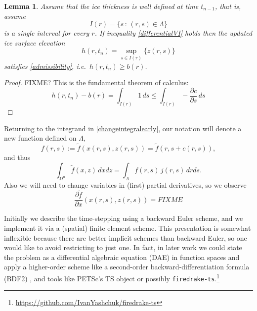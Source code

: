 \documentclass[letterpaper,final,12pt,reqno]{amsart}
\newtheorem{lemma}{Lemma}
\begin{document}
\begin{lemma}
Assume that the ice thickness is well defined at time $t_{n-1}$, that is, assume
    $$I(r) = \{s\,:\,(r,s) \in \Lambda\}$$
is a single interval for every $r$.  If inequality \eqref{differentialVI} holds then the updated ice surface elevation
    $$h(r,t_n) = \sup_{s\in I(r)}\{z(r,s)\}$$
satisfies \eqref{admissibility}, i.e.~$h(r,t_n)\ge b(r)$.
\end{lemma}

\begin{proof}
FIXME? This is the fundamental theorem of calculus:
    $$h(r,t_n) - b(r) = \int_{I(r)} 1\,ds \le \int_{I(r)} - \frac{\partial c}{\partial s}\,ds$$
\end{proof}

Returning to the integrand in \eqref{changeintegralearly}, our notation will denote a new function defined on $\Lambda$,
    $$f(r,s) := \tilde f(x(r,s),z(r,s)) = \tilde f(r,s+c(r,s)),$$
and thus
\begin{equation}
\int_{\Omega^n} \tilde f(x,z)\,dx dz = \int_\Lambda f(r,s) \, j(r,s)\,dr ds. \label{changeintegral}
\end{equation}
Also we will need to change variables in (first) partial derivatives, so we observe
    $$\frac{\partial \tilde f}{\partial x}(x(r,s),z(r,s)) = FIXME$$

Initially we describe the time-stepping using a backward Euler scheme, and we implement it via a (spatial) finite element scheme.  This presentation is somewhat inflexible because there are better implicit schemes than backward Euler, so one would like to avoid restricting to just one.  In fact, in later work we could state the problem as a differential algebraic equation (DAE) in function spaces and apply a higher-order scheme like a second-order backward-differentiation formula (BDF2) \cite{AscherPetzold1998}, and tools like PETSc's TS object \cite{Balayetal2020,BuelerBook} or possibly \texttt{firedrake-ts}.\footnote{\url{https://github.com/IvanYashchuk/firedrake-ts}}
\end{document}
